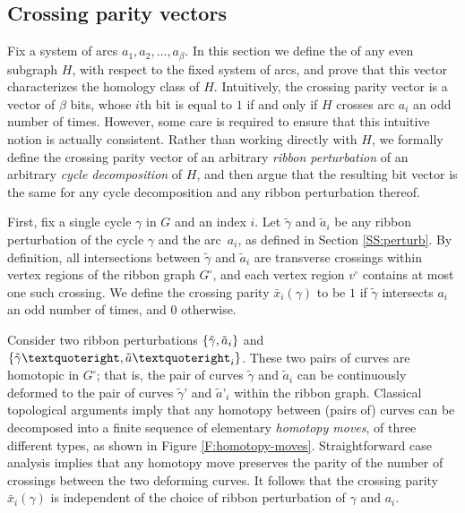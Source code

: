 \documentclass[letterpaper,review]{siamart190516}
\begin{document}
\subsection{Crossing parity vectors}

Fix a system of arcs $a_1, a_2, \dots, a_\beta$.  In this section we define the  of any even subgraph $H$, with respect to the fixed system of arcs, and prove that this vector characterizes the homology class of $H$.  Intuitively, the crossing parity vector is a vector of $\beta$ bits, whose $i$th bit is equal to $1$ if and only if $H$ crosses arc $a_i$ an odd number of times.  However, some care is required to ensure that this intuitive notion is actually consistent.  Rather than working directly with $H$, we formally define the crossing parity vector of an arbitrary \emph{ribbon perturbation} of an arbitrary \emph{cycle decomposition} of $H$, and then argue that the resulting bit vector is the same for any cycle decomposition and any ribbon perturbation thereof.

First, fix a single cycle $\gamma$ in $G$ and an index $i$.  Let $\tilde{\gamma}$ and $\tilde{a}_i$ be any ribbon perturbation of the cycle $\gamma$ and the arc~$a_i$, as defined in Section \ref{SS:perturb}.  By definition, all intersections between $\tilde\gamma$ and $\tilde{a}_i$ are transverse crossings within vertex regions of the ribbon graph $G^\square$, and each vertex region $v^\square$ contains at most one such crossing.  We define the crossing parity $\bar{x}_i(\gamma)$ to be $1$ if $\tilde\gamma$ intersects $a_i$ an odd number of times, and $0$ otherwise.

Consider two ribbon perturbations $\{ \tilde{\gamma}, \tilde{a}_i \}$ and $\set{\tilde{\gamma}’, \tilde{a}’_i}$.  These two pairs of curves are homotopic in $G^\square$; that is, the pair of curves $\tilde{\gamma}$ and $\tilde{a}_i$ can be continuously deformed to the pair of curves $\tilde{\gamma}’$ and $\tilde{a}’_i$ within the ribbon graph.  Classical topological arguments \cite{a-cas-26,ab-tkc-26,r-ebk-27} imply that any homotopy between (pairs of) curves can be decomposed into a finite sequence of elementary \emph{homotopy moves}, of three different types, as shown in Figure \ref{F:homotopy-moves}.  Straightforward case analysis implies that any homotopy move preserves the parity of the number of crossings between the two deforming curves.
It follows that the crossing parity $\bar{x}_i(\gamma)$ is independent of the choice of ribbon perturbation of $\gamma$ and $a_i$.
\end{document}
